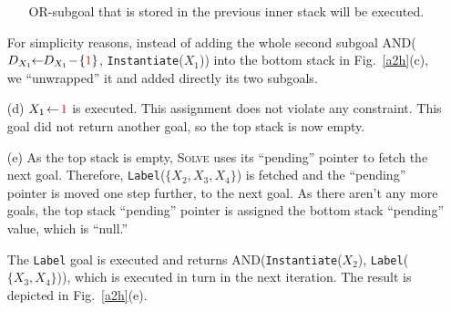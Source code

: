 \documentclass{ws-ijait}
\begin{document}
\begin{enumerate}
\begin{enumerate}
                         \textsf{OR}-subgoal that is stored
                         in the previous inner stack will be
                         executed.
             \end{enumerate}
             For simplicity reasons, instead of adding the
             whole second subgoal \textsf{AND}($D_{X_1} \!\!
             \gets \!\! D_{X_1} \! - \!
             \{\textcolor{red}{1}\}$,
             \texttt{Instantiate}($X_1$)) into the bottom
             stack in Fig.~\ref{a2h}(c), we ``unwrapped'' it
             and added directly its two subgoals.
  \item[(d)] $X_1 \! \gets \! \textcolor{red}{1}$ is
             executed. This assignment does not violate any
             constraint. This goal did not return another
             goal, so the top stack is now empty.
  \item[(e)] As the top stack is empty, \textsc{Solve} uses
             its ``pending'' pointer to fetch the next goal.
             Therefore, \texttt{Label}($\{X_2, X_3, X_4\}$)
             is fetched and the ``pending'' pointer is moved
             one step further, to the next goal. As there
             aren't any more goals, the top stack
             ``pending'' pointer is assigned the bottom
             stack ``pending'' value, which is ``null.''

             The \texttt{Label} goal is executed and returns
             \textsf{AND}(\texttt{Instantiate}($X_2$),
             \texttt{Label}($\{X_3, X_4\}$)), which is
             executed in turn in the next iteration. The
             result is depicted in Fig.~\ref{a2h}(e).


\end{enumerate}
\end{document}
